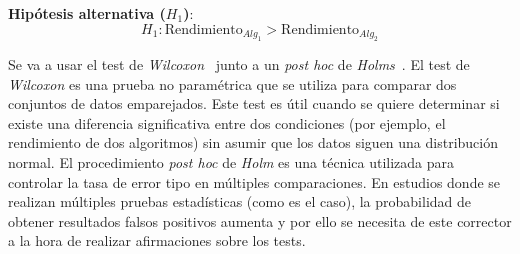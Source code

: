 \textbf{Hipótesis alternativa (\(H_1\))}:
\begin{equation}
    H_1: \text{Rendimiento}_{Alg_1} > \text{Rendimiento}_{Alg_2}
\end{equation}

Se va a usar el test de \textit{Wilcoxon}~\cite{Rey2011} junto a un \textit{post hoc} de \textit{Holms}~\cite{holm1979simple}. El test de \textit{Wilcoxon} es una prueba no paramétrica que se utiliza para comparar dos conjuntos de datos emparejados. Este test es útil cuando se quiere determinar si existe una diferencia significativa entre dos condiciones (por ejemplo, el rendimiento de dos algoritmos) sin asumir que los datos siguen una distribución normal. El procedimiento \textit{post hoc} de \textit{Holm} es una técnica utilizada para controlar la tasa de error tipo en múltiples comparaciones. En estudios donde se realizan múltiples pruebas estadísticas (como es el caso), la probabilidad de obtener resultados falsos positivos aumenta y por ello se necesita de este corrector a la hora de realizar afirmaciones sobre los tests.